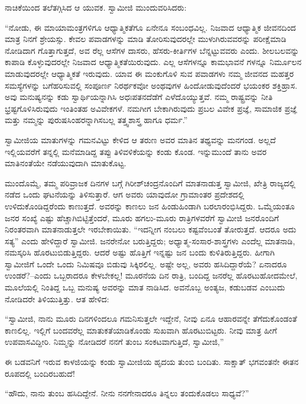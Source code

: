 ನಾಚಿಕೆಯಿಂದ ತಲೆತಗ್ಗಿಸಿದ ಆ ಯುವಕ. ಸ್ವಾಮೀಜಿ ಮುಂದುವರಿಸಿದರು:

“ನೋಡು, ಈ ಮಾಯಾಮಂತ್ರಗಳಿಗೂ ಆಧ್ಯಾತ್ಮಿಕತೆಗೂ ಏನೇನೂ ಸಂಬಂಧವಿಲ್ಲ. ನಿಜವಾದ ಆಧ್ಯಾತ್ಮಿಕ ಜೀವನದಿಂದ ಮಾತ್ರ ನಿನಗೆ ಶ್ರೇಯಸ್ಸು. ಕೇವಲ ಪವಾಡಗಳನ್ನು ಮಾಡಿ ತೋರಿಸುವುದರಲ್ಲೇ ಮುಳುಗಿರುವವರನ್ನು ಪರೀಕ್ಷೆಮಾಡಿ ನೋಡಿದಾಗ ಗೊತ್ತಾಗುತ್ತದೆ, ಅವ ರೆಲ್ಲ ಆಸೆಗಳ ದಾಸರು, ಹೆಸರು-ಕೀರ್ತಿಗಳ ಬೆನ್ನಟ್ಟುವವರು ಎಂದು. ಶೀಲಬಲವನ್ನು ಕಾಪಾಡಿ ಕೊಳ್ಳುವುದರಲ್ಲೇ ನಿಜವಾದ ಆಧ್ಯಾತ್ಮಿಕತೆಯಿರುವುದು. ಎಲ್ಲ ಆಸೆಗಳನ್ನೂ ಕಾಮಭಾವನೆ ಗಳನ್ನೂ ನಿರ್ಮೂಲನ ಮಾಡುವುದರಲ್ಲೇ ಆಧ್ಯಾತ್ಮಿಕತೆ ಇರುವುದು. ಯಾವ ಈ ಮಂಕುಗೊಳಿ ಸುವ ಪವಾಡಗಳು ನಮ್ಮ ಜೀವನದ ಮಹತ್ತರ ಸಮಸ್ಯೆಗಳನ್ನು ಬಗೆಹರಿಸುವಲ್ಲಿ ಸಂಪೂರ್ಣ ನಿರರ್ಥಕವೋ ಅಂಥವುಗಳ ಹಿಂದೋಡುವುದೆಂದರೆ ಭಯಂಕರ ಶಕ್ತಿಹ್ರಾಸ. ಅವು ಮನುಷ್ಯನನ್ನು ಕಡು ಸ್ವಾರ್ಥಿಯನ್ನಾಗಿಸಿ ಅಧಃಪತನದೆಡೆಗೆ ಎಳೆದೊಯ್ಯುತ್ತವೆ. ನಮ್ಮ ರಾಷ್ಟ್ರವನ್ನು ನೀತಿ ಭ್ರಷ್ಟಗೊಳಿಸಿರುವುದು ಇಂತಿಂತಹ ಅವಿವೇಕಗಳೆ. ನಮಗೀಗ ಬೇಕಾಗಿರುವುದು ಪ್ರಬಲ ವಿವೇಕ ಪ್ರಜ್ಞೆ, ಸಾಮಾಜಿಕ ಪ್ರಜ್ಞೆ ಮತ್ತು ನಮ್ಮನ್ನು ಪುರುಷಸಿಂಹರನ್ನಾಗಿಸಬಲ್ಲ ತತ್ತ್ವಶಾಸ್ತ್ರ ಹಾಗೂ ಧರ್ಮ.”

ಸ್ವಾಮೀಜಿಯ ಮಾತುಗಳನ್ನು ಗಮನವಿಟ್ಟು ಕೇಳಿದ ಆ ತರುಣ ಅವರ ಮಾತಿನ ತಥ್ಯವನ್ನು ಮನಗಂಡ. ಅಲ್ಲದೆ ಇಲ್ಲಿಯವರೆಗೆ ತನ್ನಲ್ಲಿ ಮನೆಮಾಡಿದ್ದ ತಪ್ಪು ತಿಳಿವಳಿಕೆಯನ್ನು ಕಂಡು ಕೊಂಡ. ಇನ್ನುಮುಂದೆ ತಾನು ಅವರ ಮಾತಿನಂತೆಯೇ ನಡೆಯುವುದಾಗಿ ಮಾತುಕೊಟ್ಟ.

ಮುಂದೊಮ್ಮೆ, ತಮ್ಮ ಪರಿವ್ರಾಜಕ ದಿನಗಳ ಬಗ್ಗೆ ಗಿರೀಶ್​ಚಂದ್ರನೊಂದಿಗೆ ಮಾತನಾಡುತ್ತ ಸ್ವಾಮೀಜಿ, ಖೇತ್ರಿ ರಾಜ್ಯದಲ್ಲಿ ನಡೆದ ಒಂದು ಘಟನೆಯನ್ನು ತಿಳಿಸುತ್ತಾರೆ. ಆಗ ಅವರು ಯಾವುದೋ ಗ್ರಾಮಾಂತರ ಪ್ರದೇಶದಲ್ಲಿ ಉಳಿದುಕೊಂಡಿದ್ದರೆಂದು ಕಾಣುತ್ತದೆ. ಅವರನ್ನು ಕಾಣಲು ಜನ ಹಿಂಡುಹಿಂಡಾಗಿ ಬರಲಾರಂಭಿಸಿದ್ದರು. ಒಮ್ಮೆಯಂತೂ ಜನರ ಸಂಖ್ಯೆ ಎಷ್ಟು ಹೆಚ್ಚಾಗಿಬಿಟ್ಟಿತ್ತೆಂದರೆ, ಮೂರು ಹಗಲು-ಮೂರು ರಾತ್ರಿಗಳವರೆಗೆ ಸ್ವಾಮೀಜಿ ಜನರೊಂದಿಗೆ ನಿರಂತರವಾಗಿ ಮಾತನಾಡುತ್ತಲೇ ಇರಬೇಕಾಯಿತು. “ಇದನ್ನೀಗ ನಂಬಲು ಕಷ್ಟವೆಂಬಂತೆ ತೋರುತ್ತದೆ. ಆದರೂ ಅದು ಸತ್ಯ” ಎಂದು ಹೇಳಿದ್ದಾರೆ ಸ್ವಾಮೀಜಿ. ಜನರೇನೋ ಬರುತ್ತಿದ್ದರು; ಅಧ್ಯಾತ್ಮ-ಸಂಸಾರ-ಶಾಸ್ತ್ರಗಳು ಎಂದೆಲ್ಲ ಮಾತನಾಡಿ, ನಮಸ್ಕರಿಸಿ ಹೊರಟುಬಿಡುತ್ತಿದ್ದರು. ಆದರೆ ಅಷ್ಟು ಹೊತ್ತಿಗೆ ಇನ್ನಷ್ಟು ಜನ ಬಂದು ಕುಳಿತಿರುತ್ತಿದ್ದರು. ಹೀಗಾಗಿ ಸ್ವಾಮೀಜಿಗೆ ಒಂದೇ ಒಂದು ನಿಮಿಷವೂ ಬಿಡುವು ಸಿಕ್ಕಿರಲಿಲ್ಲ. ಅಷ್ಟೇ ಅಲ್ಲ, ಅವರು ಹಸಿದಿದ್ದಾರೆಯೆ? ಏನಾದರೂ ಉಂಡರೆ?–ಎಂದು ಒಬ್ಬರಾದರೂ ಕೇಳಬೇಕಲ್ಲ! ಮೂರನೆಯ ದಿನ ರಾತ್ರಿ, ಬಂದಿದ್ದ ಜನರೆಲ್ಲ ಹೊರಟುಹೋದಮೇಲೆ, ಮೂಲೆಯಲ್ಲಿ ನಿಂತಿದ್ದ ಒಬ್ಬ ಮನುಷ್ಯ ಅವರನ್ನು ಮಾತ ನಾಡಿಸಿದ. ಅವನೊಬ್ಬ ಅಂತ್ಯಜ, ಕಡುಬಡವ ಎಂಬುದು ನೋಡಿದರೇ ತಿಳಿಯುತ್ತಿತ್ತು. ಆತ ಹೇಳಿದ:

“ಸ್ವಾಮೀಜಿ, ನಾನು ಮೂರು ದಿನಗಳಿಂದಲೂ ಗಮನಿಸುತ್ತಲೇ ಇದ್ದೇನೆ, ನೀವು ಏನೂ ಆಹಾರವನ್ನೇ ತೆಗೆದುಕೊಂಡಂತೆ ಕಾಣಲಿಲ್ಲ. ಇಲ್ಲಿಗೆ ಬಂದವರೆಲ್ಲ ಮಾತುಕತೆಯಾಡಿಕೊಂಡು ಸುಖವಾಗಿ ಹೊರಟುಬಿಟ್ಟರು. ನೀವು ಮಾತ್ರ ಹೀಗೆ ಉಪವಾಸವಿದ್ದೀರಿ. ನಿಮ್ಮನ್ನು ನೋಡಿದರೆ ನನಗೆ ತುಂಬ ಸಂಕಟವಾಗುತ್ತಿದೆ, ಸ್ವಾಮೀಜಿ,”

ಈ ಬಡವನಿಗೆ ಇರುವ ಕಾಳಜಿಯನ್ನು ಕಂಡು ಸ್ವಾಮೀಜಿಯ ಹೃದಯ ತುಂಬಿ ಬಂದಿತು. ಸಾಕ್ಷಾತ್ ಭಗವಂತನೇ ಈತನ ರೂಪದಲ್ಲಿ ಬಂದಿರಬಹುದೆ!

“ಹೌದು, ನಾನು ತುಂಬ ಹಸಿದಿದ್ದೇನೆ. ನೀನು ನನಗೇನಾದರೂ ತಿನ್ನಲು ತಂದುಕೊಡಲು ಸಾಧ್ಯವೆ?”

